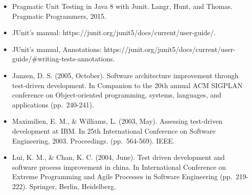 \begin{itemize}
\item
  Pragmatic Unit Testing in Java 8 with Junit. Langr, Hunt, and Thomas.
  Pragmatic Programmers, 2015.
\item
  JUnit's manual: https://junit.org/junit5/docs/current/user-guide/.
\item
  JUnit's manual, Annotations:
  https://junit.org/junit5/docs/current/user-guide/\#writing-tests-annotations.
\item
  Janzen, D. S. (2005, October). Software architecture improvement
  through test-driven development. In Companion to the 20th annual ACM
  SIGPLAN conference on Object-oriented programming, systems, languages,
  and applications (pp.~240-241).
\item
  Maximilien, E. M., \& Williams, L. (2003, May). Assessing test-driven
  development at IBM. In 25th International Conference on Software
  Engineering, 2003. Proceedings. (pp.~564-569). IEEE.
\item
  Lui, K. M., \& Chan, K. C. (2004, June). Test driven development and
  software process improvement in china. In International Conference on
  Extreme Programming and Agile Processes in Software Engineering
  (pp.~219-222). Springer, Berlin, Heidelberg.
\end{itemize}
